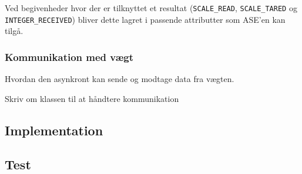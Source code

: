 \documentclass[a4paper]{article}
\begin{document}
Ved begivenheder hvor der er tilknyttet et resultat (\texttt{SCALE\_READ}, \texttt{SCALE\_TARED} og \texttt{INTEGER\_RECEIVED}) bliver dette lagret i passende attributter som ASE'en kan tilgå.


\subsubsection{Kommunikation med vægt} %

Hvordan den asynkront kan sende og modtage data fra vægten.

Skriv om klassen til at håndtere kommunikation



\subsection{Implementation} %


\subsection{Test} %


\end{document}
